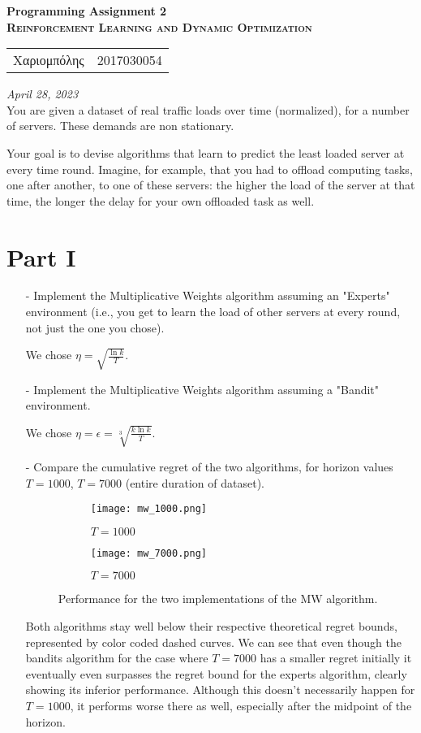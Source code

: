 \documentclass[11pt, final]{article}
\makeatletter
\newcommand{\el}{\selectlanguage{greek}}	%
\newcommand{\SheetTitle}[3]{	%
	{\noindent\Huge\bf{#1}}\\
	[1.4\baselineskip]{{\large\bf\textsc{#2}}}\\
	[0.2\baselineskip]
	{\large\begin{tabular}{@{}ll}
		\elΙωάννης Χαριομπόλης & 2017030054\\
	\end{tabular}}\hfill{\large \textit{#3}}
	\\[0.01\baselineskip]
}
\makeatother
\begin{document}
	\SheetTitle{Programming Assignment 2}{Reinforcement Learning and Dynamic Optimization}{April 28, 2023}
	
	You are given a dataset of real traffic loads over time (normalized), for a number of servers. These demands are non stationary.
	
	Your goal is to devise algorithms that learn to predict the least loaded server at every time round. Imagine, for example, that you had to offload computing tasks, one after another, to one of these servers: the higher the load of the server at that time, the longer the delay for your own offloaded task as well.
	
	\section*{Part I}
	\begin{itemize}
		\item[-] Implement the Multiplicative Weights algorithm assuming an "Experts" environment (i.e., you get to learn the load of other servers at every round, not just the one you chose).
		
		We chose $\eta = \sqrt{\frac{\ln k}{T}}$.
		
		\item[-] Implement the Multiplicative Weights algorithm assuming a "Bandit" environment.
		
		We chose $\eta = \epsilon = \sqrt[3]{\frac{k \ln k}{T}}$.
				
		\item[-] Compare the cumulative regret of the two algorithms, for horizon values $T = 1000$, $T = 7000$ (entire duration of dataset).
		\begin{figure}[h!]
			\centering
			\begin{subfigure}[b]{0.45\textwidth}
				\centering
				\texttt{[image: mw\_1000.png]}
				\caption{$T = 1000$}
			\end{subfigure}
			\hfill
			\begin{subfigure}[b]{0.45\textwidth}
				\centering
				\texttt{[image: mw\_7000.png]}
				\caption{$T = 7000$}
			\end{subfigure}
			\caption{Performance for the two implementations of the MW algorithm.}
		\end{figure}
	
		Both algorithms stay well below their respective theoretical regret bounds, represented by color coded dashed curves. We can see that even though the bandits algorithm for the case where $T = 7000$ has a smaller regret initially it eventually even surpasses the regret bound for the experts algorithm, clearly showing its inferior performance. Although this doesn't necessarily happen for $T = 1000$, it performs worse there as well, especially after the midpoint of the horizon.
	\end{itemize}
	
\end{document}
